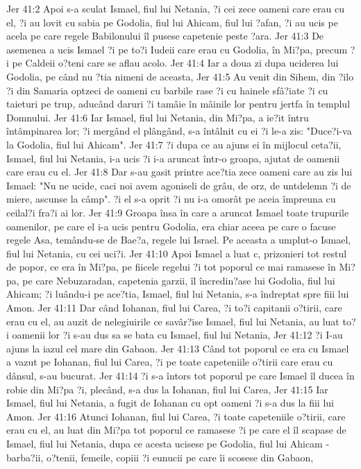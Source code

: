 Jer 41:2  Apoi s-a sculat Ismael, fiul lui Netania, ?i cei zece oameni care erau cu el, ?i au lovit cu sabia pe Godolia, fiul lui Ahicam, fiul lui ?afan, ?i au ucis pe acela pe care regele Babilonului îl pusese capetenie peste ?ara.
Jer 41:3  De asemenea a ucis Ismael ?i pe to?i Iudeii care erau cu Godolia, în Mi?pa, precum ?i pe Caldeii o?teni care se aflau acolo.
Jer 41:4  Iar a doua zi dupa uciderea lui Godolia, pe când nu ?tia nimeni de aceasta,
Jer 41:5  Au venit din Sihem, din ?ilo ?i din Samaria optzeci de oameni cu barbile rase ?i cu hainele sfâ?iate ?i cu taieturi pe trup, aducând daruri ?i tamâie în mâinile lor pentru jertfa în templul Domnului.
Jer 41:6  Iar Ismael, fiul lui Netania, din Mi?pa, a ie?it întru întâmpinarea lor; ?i mergând el plângând, s-a întâlnit cu ei ?i le-a zis: "Duce?i-va la Godolia, fiul lui Ahicam".
Jer 41:7  ?i dupa ce au ajuns ei în mijlocul ceta?ii, Ismael, fiul lui Netania, i-a ucis ?i i-a aruncat într-o groapa, ajutat de oamenii care erau cu el.
Jer 41:8  Dar s-au gasit printre ace?tia zece oameni care au zis lui Ismael: "Nu ne ucide, caci noi avem agoniseli de grâu, de orz, de untdelemn ?i de miere, ascunse la câmp". ?i el s-a oprit ?i nu i-a omorât pe aceia împreuna cu ceilal?i fra?i ai lor.
Jer 41:9  Groapa însa în care a aruncat Ismael toate trupurile oamenilor, pe care el i-a ucis pentru Godolia, era chiar aceea pe care o facuse regele Asa, temându-se de Bae?a, regele lui Israel. Pe aceasta a umplut-o Ismael, fiul lui Netania, cu cei uci?i.
Jer 41:10  Apoi Ismael a luat c, prizonieri tot restul de popor, ce era în Mi?pa, pe fiicele regelui ?i tot poporul ce mai ramasese în Mi?pa, pe care Nebuzaradan, capetenia garzii, îl încredin?ase lui Godolia, fiul lui Ahicam; ?i luându-i pe ace?tia, Ismael, fiul lui Netania, s-a îndreptat spre fiii lui Amon.
Jer 41:11  Dar când Iohanan, fiul lui Carea, ?i to?i capitanii o?tirii, care erau cu el, au auzit de nelegiuirile ce savâr?ise Ismael, fiul lui Netania, au luat to?i oamenii lor ?i s-au dus sa se bata cu Ismael, fiul lui Netania,
Jer 41:12  ?i I-au ajuns la iazul cel mare din Gabaon.
Jer 41:13  Când tot poporul ce era cu Ismael a vazut pe Iohanan, fiul lui Carea, ?i pe toate capeteniile o?tirii care erau cu dânsul, s-au bucurat.
Jer 41:14  ?i s-a întors tot poporul pe care Ismael îl ducea în robie din Mi?pa ?i, plecând, s-a dus la Iohanan, fiul lui Carea,
Jer 41:15  Iar Ismael, fiul lui Netania, a fugit de Iohanan cu opt oameni ?i s-a dus la fiii lui Amon.
Jer 41:16  Atunci Iohanan, fiul lui Carea, ?i toate capeteniile o?tirii, care erau cu el, au luat din Mi?pa tot poporul ce ramasese ?i pe care el îl scapase de Ismael, fiul lui Netania, dupa ce acesta ucisese pe Godolia, fiul lui Ahicam - barba?ii, o?tenii, femeile, copiii ?i eunucii pe care îi scosese din Gabaon,
